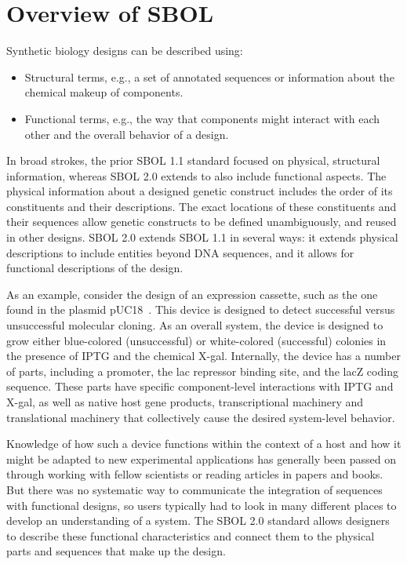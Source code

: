 \section{Overview of SBOL}

Synthetic biology designs can be described using:
\begin{itemize}
\item Structural terms, e.g., a set of annotated sequences or information about the chemical makeup of components.
\item Functional terms, e.g., the way that components might interact with each other and the overall behavior of a design.
\end{itemize}
In broad strokes, the prior SBOL 1.1 standard focused on physical, structural information, whereas SBOL 2.0 extends to also include functional aspects. 
The physical information about a designed genetic construct includes the order of its constituents and their descriptions. The exact locations of these constituents and their sequences allow genetic constructs to be defined unambiguously, and reused in other designs. SBOL 2.0 extends SBOL 1.1 in several ways: it extends physical descriptions to include entities beyond DNA sequences, and it allows for functional descriptions of the design. 

As an example, consider the design of an expression cassette, such as the one found in the plasmid pUC18~\cite{L08752.1}. This device is designed to detect successful versus unsuccessful molecular cloning. 
As an overall system, the device is designed to grow either blue-colored (unsuccessful) or white-colored (successful) colonies in the presence of IPTG and the chemical X-gal. Internally, the device has a number of parts, including a promoter, the lac repressor binding site, and the lacZ coding sequence. 
These parts have specific component-level interactions with IPTG and X-gal, as well as native host gene products, transcriptional machinery and translational machinery that collectively cause the desired system-level behavior. 

Knowledge of how such a device functions within the context of a host and how it might be adapted to new experimental applications has generally been passed on through working with fellow scientists or reading articles in papers and books. 
But there was no systematic way to communicate the integration of sequences with functional designs, so users typically had to look in many different places to develop an understanding of a system.  
The SBOL 2.0 standard allows designers to describe these functional characteristics and connect them to the physical parts and sequences that make up the design. 


